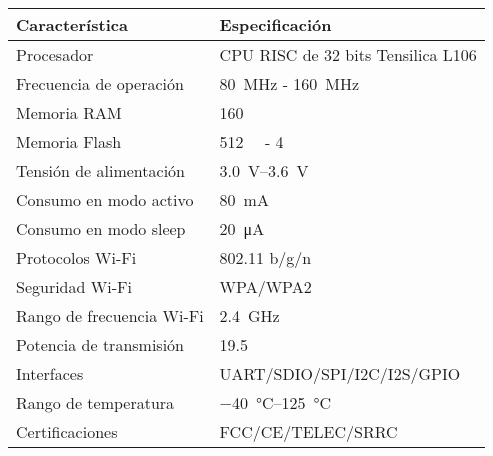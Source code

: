 	\begin{tabular}{ll}
		\toprule
		\textbf{Característica} & \textbf{Especificación} \\
		\midrule
		Procesador & CPU RISC de 32 bits Tensilica L106 \\
		Frecuencia de operación & \SI{80}{\mega\hertz} - \SI{160}{\mega\hertz} \\
		Memoria RAM & \SI{160}{\kilo\byte} \\
		Memoria Flash & \SI{512}{\kilo\byte} - \SI{4}{\mega\byte} \\
		Tensión de alimentación & \SIrange{3.0}{3.6}{\volt} \\
		Consumo en modo activo & \SI{80}{\milli\ampere} \\
		Consumo en modo sleep & \SI{20}{\micro\ampere} \\
		Protocolos Wi-Fi & 802.11 b/g/n \\
		Seguridad Wi-Fi & WPA/WPA2 \\
		Rango de frecuencia Wi-Fi & \SI{2.4}{\giga\hertz} \\
		Potencia de transmisión & \SI{19.5}{\dBm} \\
		Interfaces & UART/SDIO/SPI/I2C/I2S/GPIO \\
		Rango de temperatura & \SIrange{-40}{125}{\celsius} \\
		Certificaciones & FCC/CE/TELEC/SRRC \\
		\bottomrule
	\end{tabular}